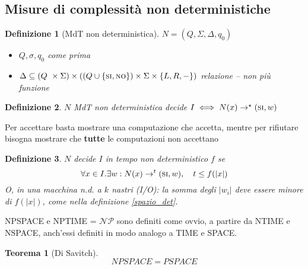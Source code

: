 \documentclass[a4paper,10pt,oneside]{article}
\theoremstyle{break}
\newtheorem{deff}{Definizione}[section]
\newtheorem{teo}{Teorema}[subsection]
\newcommand{\SI}{\textsc{si}}
\newcommand{\NO}{\textsc{no}}
\begin{document}
\subsection{Misure di complessità non deterministiche}

\begin{deff}[MdT non deterministica]
 $N = (Q, \Sigma, \Delta, q_0)$

 \begin{itemize}
  \item $Q, \sigma, q_0$ come prima
  \item $\Delta \subseteq (Q\ \times \Sigma) \times ((Q \cup \{\SI, \NO\}) \times \Sigma \times \{ L, R, - \})$ \hspace{1cm} relazione -- non più funzione
 \end{itemize}

\end{deff}


\begin{deff}
 $N$ MdT \emph{non deterministica} decide $I \iff N(x) \to^{\star} (\SI, w)$
\end{deff}

Per accettare basta mostrare una computazione che accetta, mentre per rifiutare bisogna mostrare che \textbf{tutte} le computazioni non accettano

\begin{deff}
 $N$ decide $I$ in tempo \emph{non deterministico} $f$ se
 \[ \forall x \in I . \exists w : N(x) \to^t (\SI, w), \quad t \leq f(|x|)\]
 O, in una macchina n.d. a $k$ nastri (I/O): la somma degli $|w_i|$ deve essere minore di $f(|x|)$, come nella definizione \ref{spazio_det}.
\end{deff}

NPSPACE e NPTIME = $\mathcal{NP}$ sono definiti come ovvio, a partire da NTIME e NSPACE, anch'essi definiti in modo analogo a TIME e SPACE.

\begin{mdframed}
\begin{teo}[Di Savitch]
 \[ NPSPACE = PSPACE \]
\end{teo}
\end{mdframed}
\end{document}
